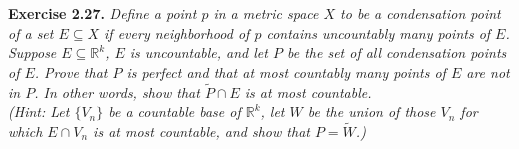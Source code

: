\documentclass{article}
\begin{document}



\textbf{Exercise 2.27.}
\emph{
Define a point $p$ in a metric space $X$ to be a {\it condensation
point} of a set $E \subseteq X$ if every neighborhood of $p$ contains
uncountably many points of $E$.} \\

\emph{Suppose $E \subseteq \mathbb{R}^k$, $E$ is uncountable,
and let $P$ be the set of all condensation points of $E$.
Prove that $P$ is perfect and that at most countably many points of $E$ are not in $P$.
In other words, show that $\widetilde{P} \cap E$ is at most countable.} \\

\emph{(Hint: Let $\{V_n\}$ be a countable base of $\mathbb{R}^k$,
let $W$ be the union of those $V_n$ for which $E \cap V_n$ is at most countable,
and show that $P = \widetilde{W}$.)} \\
\end{document}

